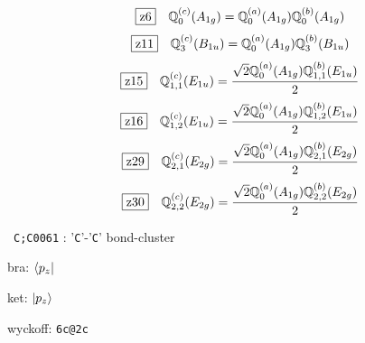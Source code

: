 \documentclass[fleqn,10pt,landscape]{jsarticle}
\begin{document}
\begin{dmath*}
\hspace*{3mm}\fbox{z6}\quad \mathbb{Q}_{0}^{(c)}(A_{1g})=\mathbb{Q}_{0}^{(a)}(A_{1g}) \mathbb{Q}_{0}^{(b)}(A_{1g})
\end{dmath*}
\begin{dmath*}
\hspace*{3mm}\fbox{z11}\quad \mathbb{Q}_{3}^{(c)}(B_{1u})=\mathbb{Q}_{0}^{(a)}(A_{1g}) \mathbb{Q}_{3}^{(b)}(B_{1u})
\end{dmath*}
\begin{dmath*}
\hspace*{3mm}\fbox{z15}\quad \mathbb{Q}_{1,1}^{(c)}(E_{1u})=\frac{\sqrt{2} \mathbb{Q}_{0}^{(a)}(A_{1g}) \mathbb{Q}_{1,1}^{(b)}(E_{1u})}{2}
\end{dmath*}
\begin{dmath*}
\hspace*{3mm}\fbox{z16}\quad \mathbb{Q}_{1,2}^{(c)}(E_{1u})=\frac{\sqrt{2} \mathbb{Q}_{0}^{(a)}(A_{1g}) \mathbb{Q}_{1,2}^{(b)}(E_{1u})}{2}
\end{dmath*}
\begin{dmath*}
\hspace*{3mm}\fbox{z29}\quad \mathbb{Q}_{2,1}^{(c)}(E_{2g})=\frac{\sqrt{2} \mathbb{Q}_{0}^{(a)}(A_{1g}) \mathbb{Q}_{2,1}^{(b)}(E_{2g})}{2}
\end{dmath*}
\begin{dmath*}
\hspace*{3mm}\fbox{z30}\quad \mathbb{Q}_{2,2}^{(c)}(E_{2g})=\frac{\sqrt{2} \mathbb{Q}_{0}^{(a)}(A_{1g}) \mathbb{Q}_{2,2}^{(b)}(E_{2g})}{2}
\end{dmath*}
\vspace{5mm}

\noindent\textbullet\, \texttt{C;C\texttt{}006\texttt{}1} : '\texttt{C}'-'\texttt{C}' bond-cluster

\noindent\quad * bra: $\bra{p_{z}}$

\noindent\quad * ket: $\ket{p_{z}}$

\noindent\quad * wyckoff: \texttt{6c@2c}
\end{document}
